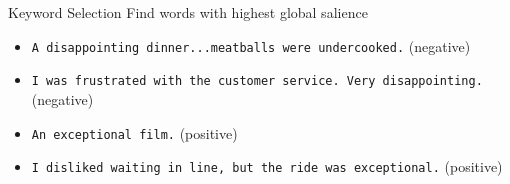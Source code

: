 \begin{frame}{Keyword Selection}
    Find words with highest global salience
    \begin{itemize}
        \color{white}
    \item[] \texttt{A \textcolor{salience4}{disappointing} dinner...meatballs were undercooked.}
            (negative)
        \item[] \texttt{I was frustrated with the customer service. Very
            disappointing.}
            (negative)
        \item[] \texttt{An \textcolor{salience4}{exceptional} film.} (positive)
        \item[] \texttt{I disliked waiting in line, but the ride was exceptional.} (positive)
    \end{itemize}
\end{frame}


\begin{frame}{Video Demo for User Interface}
    \begin{figure}
        \centering
        \texttt{[image: \\figfile\{ui-fr.pdf]}}
    \end{figure}
\end{frame}
